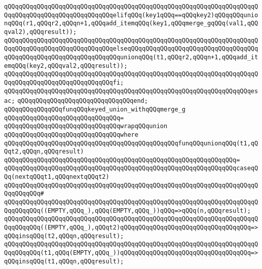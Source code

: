 \verb|qQQqqQQqqQQqqQQqqQQqqQQqqQQqqQQqqQQqqQQqqQQqqQQqqQQqqQQqqQQqqQQqqQQqqQQqqQQqqQQqqQQqqQQqqQQqqQQqqQQqelifqQQq(key1qQQq==qQQqkey2)qQQqqQQqunionqQQq(r1,qQQqr2,qQQqn+1,qQQqadd_itemqQQq(key1,qQQqmerge_gqQQq(val1,qQQqval2),qQQqresult));|\newline
\verb|qQQqqQQqqQQqqQQqqQQqqQQqqQQqqQQqqQQqqQQqqQQqqQQqqQQqqQQqqQQqqQQqqQQqqQQqqQQqqQQqqQQqqQQqqQQqqQQqqQQqelseqQQqqQQqqQQqqQQqqQQqqQQqqQQqqQQqqQQqqQQqqQQqqQQqqQQqqQQqqQQqqQQqqQQqunionqQQq(t1,qQQqr2,qQQqn+1,qQQqadd_itemqQQq(key2,qQQqval2,qQQqresult));|\newline
\verb|qQQqqQQqqQQqqQQqqQQqqQQqqQQqqQQqqQQqqQQqqQQqqQQqqQQqqQQqqQQqqQQqqQQqqQQqqQQqqQQqqQQqqQQqqQQqqQQqqQQqfi;|\newline
\verb|qQQqqQQqqQQqqQQqqQQqqQQqqQQqqQQqqQQqqQQqqQQqqQQqqQQqqQQqqQQqqQQqqQQqesac;|\newline
\verb|qQQqqQQqqQQqqQQqqQQqqQQqqQQqqQQqend;|\newline
\newline
\verb|qQQqqQQqqQQqqQQqfunqQQqkeyed_union_withqQQqmerge_g|\newline
\verb|qQQqqQQqqQQqqQQqqQQqqQQqqQQqqQQq=|\newline
\verb|qQQqqQQqqQQqqQQqqQQqqQQqqQQqqQQqwrapqQQqunion|\newline
\verb|qQQqqQQqqQQqqQQqqQQqqQQqqQQqqQQqwhere|\newline
\verb|qQQqqQQqqQQqqQQqqQQqqQQqqQQqqQQqqQQqqQQqqQQqqQQqfunqQQqunionqQQq(t1,qQQqt2,qQQqn,qQQqresult)|\newline
\verb|qQQqqQQqqQQqqQQqqQQqqQQqqQQqqQQqqQQqqQQqqQQqqQQqqQQqqQQqqQQqqQQq=|\newline
\verb|qQQqqQQqqQQqqQQqqQQqqQQqqQQqqQQqqQQqqQQqqQQqqQQqqQQqqQQqqQQqqQQqcaseqQQq(nextqQQqt1,qQQqnextqQQqt2)|\newline
\verb|qQQqqQQqqQQqqQQqqQQqqQQqqQQqqQQqqQQqqQQqqQQqqQQqqQQqqQQqqQQqqQQqqQQqqQQqqQQqqQQq#|\newline
\verb|qQQqqQQqqQQqqQQqqQQqqQQqqQQqqQQqqQQqqQQqqQQqqQQqqQQqqQQqqQQqqQQqqQQqqQQqqQQqqQQq((EMPTY,qQQq_),qQQq(EMPTY,qQQq_))qQQq=>qQQq(n,qQQqresult);|\newline
\verb|qQQqqQQqqQQqqQQqqQQqqQQqqQQqqQQqqQQqqQQqqQQqqQQqqQQqqQQqqQQqqQQqqQQqqQQqqQQqqQQq((EMPTY,qQQq_),qQQqt2)qQQqqQQqqQQqqQQqqQQqqQQqqQQqqQQqqQQq=>qQQqinsqQQq(t2,qQQqn,qQQqresult);|\newline
\verb|qQQqqQQqqQQqqQQqqQQqqQQqqQQqqQQqqQQqqQQqqQQqqQQqqQQqqQQqqQQqqQQqqQQqqQQqqQQqqQQq(t1,qQQq(EMPTY,qQQq_))qQQqqQQqqQQqqQQqqQQqqQQqqQQqqQQqqQQq=>qQQqinsqQQq(t1,qQQqn,qQQqresult);|\newline
